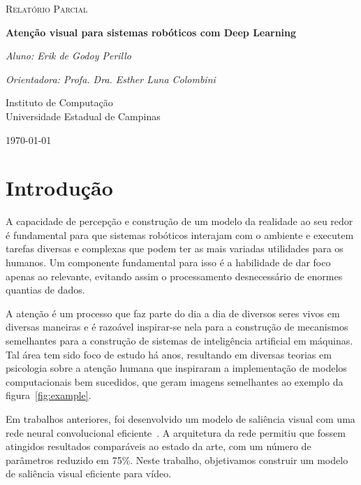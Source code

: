 \documentclass[article]{IEEEtran}
\begin{document}

\begin{titlepage}
	\centering
	{\scshape\Large Relatório Parcial\par}
	\vspace{1.5cm}
	{\huge\bfseries Atenção visual para sistemas robóticos com Deep Learning\par}
	\vspace{1cm}
	{\itshape Aluno: Erik de Godoy Perillo\par}
	{\itshape Orientadora: Profa. Dra. Esther Luna Colombini\par}
	\vspace{0.5cm}
	\vfill
    Instituto de Computação\\
	Universidade Estadual de Campinas
	\vfill
	{\large \today\par}
\end{titlepage}

\newpage

\section{Introdução}
A capacidade de percepção e construção de um modelo da realidade ao seu redor
é fundamental para que sistemas robóticos interajam com o ambiente e executem
tarefas diversas e complexas que podem ter as mais variadas utilidades para
os humanos.
Um componente fundamental para isso é a habilidade de dar foco apenas ao
relevante, evitando assim o processamento desnecessário de enormes quantias
de dados.

A atenção é um processo que faz parte do dia a dia de diversos seres vivos
em diversas maneiras e é razoável inspirar-se nela para a construção de
mecanismos semelhantes para a construção de sistemas de inteligência
artificial em máquinas.
Tal área tem sido foco de estudo há anos, resultando em diversas teorias
em psicologia sobre a atenção humana que inspiraram a implementação de
modelos computacionais bem sucedidos, que geram imagens semelhantes ao
exemplo da figura~\ref{fig:example}.

Em trabalhos anteriores, foi desenvolvido um modelo de saliência
visual com uma rede neural convolucional eficiente~\cite{oldic}.
A arquitetura da rede permitiu que fossem atingidos resultados comparáveis
ao estado da arte, com um número de parâmetros reduzido em 75\%.
Neste trabalho, objetivamos construir um modelo de saliência visual eficiente
para vídeo.
\end{document}
